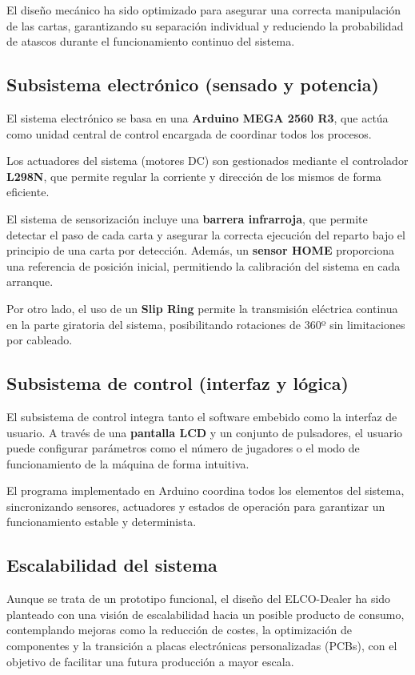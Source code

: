 \documentclass[a4paper, 11pt]{article}
\begin{document}
El diseño mecánico ha sido optimizado para asegurar una correcta manipulación de las cartas, garantizando su separación individual y reduciendo la probabilidad de atascos durante el funcionamiento continuo del sistema.

\subsection{Subsistema electrónico (sensado y potencia)}

El sistema electrónico se basa en una \textbf{Arduino MEGA 2560 R3}, que actúa como unidad central de control encargada de coordinar todos los procesos.

Los actuadores del sistema (motores DC) son gestionados mediante el controlador \textbf{L298N}, que permite regular la corriente y dirección de los mismos de forma eficiente.

El sistema de sensorización incluye una \textbf{barrera infrarroja}, que permite detectar el paso de cada carta y asegurar la correcta ejecución del reparto bajo el principio de una carta por detección. Además, un \textbf{sensor HOME} proporciona una referencia de posición inicial, permitiendo la calibración del sistema en cada arranque.

Por otro lado, el uso de un \textbf{Slip Ring} permite la transmisión eléctrica continua en la parte giratoria del sistema, posibilitando rotaciones de 360º sin limitaciones por cableado.

\subsection{Subsistema de control (interfaz y lógica)}

El subsistema de control integra tanto el software embebido como la interfaz de usuario. A través de una \textbf{pantalla LCD} y un conjunto de pulsadores, el usuario puede configurar parámetros como el número de jugadores o el modo de funcionamiento de la máquina de forma intuitiva.

El programa implementado en Arduino coordina todos los elementos del sistema, sincronizando sensores, actuadores y estados de operación para garantizar un funcionamiento estable y determinista.

\subsection{Escalabilidad del sistema}

Aunque se trata de un prototipo funcional, el diseño del ELCO-Dealer ha sido planteado con una visión de escalabilidad hacia un posible producto de consumo, contemplando mejoras como la reducción de costes, la optimización de componentes y la transición a placas electrónicas personalizadas (PCBs), con el objetivo de facilitar una futura producción a mayor escala.
\end{document}
